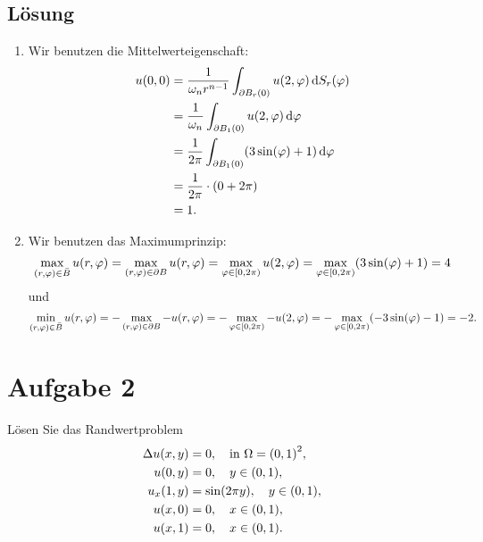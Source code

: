 \documentclass{exercise}
\begin{document}
    \subsection*{Lösung}
    \begin{enumerate}
        \item Wir benutzen die Mittelwerteigenschaft:
        \begin{align*}
            u\parentheses*{0, 0} &= \frac{1}{\omega_n r^{n - 1}}\int_{\partial B_r\parentheses*{0}}u\parentheses*{2, \varphi}\d S_r\parentheses*{\varphi}\\
            &= \frac{1}{\omega_n}\int_{\partial B_1\parentheses*{0}}u\parentheses*{2, \varphi}\d\varphi\\
            &= \frac{1}{2\pi}\int_{\partial B_1\parentheses*{0}}\parentheses*{3\sin\parentheses*{\varphi} + 1}\d\varphi\\
            &= \frac{1}{2\pi} \cdot \parentheses*{0 + 2\pi}\\
            &= 1.
        \end{align*}
        \item Wir benutzen das Maximumprinzip:
        \[
            \max_{\parentheses*{r, \varphi} \in \bar{B}}u\parentheses*{r, \varphi} = \max_{\parentheses*{r, \varphi} \in \partial B}u\parentheses*{r, \varphi} = \max_{\varphi \in \left[0, 2\pi\right)}u\parentheses*{2, \varphi} = \max_{\varphi \in \left[0, 2\pi\right)}\parentheses*{3\sin\parentheses*{\varphi} + 1} = 4
        \]
        und
        \[
            \min_{\parentheses*{r, \varphi} \in \bar{B}}u\parentheses*{r, \varphi} = -\max_{\parentheses*{r, \varphi} \in \partial B}-u\parentheses*{r, \varphi} = -\max_{\varphi \in \left[0, 2\pi\right)}-u\parentheses*{2, \varphi} = -\max_{\varphi \in \left[0, 2\pi\right)}\parentheses*{-3\sin\parentheses*{\varphi} - 1} = -2.
        \]
    \end{enumerate}


    \section*{Aufgabe 2}

    \begin{problem}
        Lösen Sie das Randwertproblem
        \begin{align*}
            \Delta u\parentheses*{x, y} &= 0, \quad \text{in }\Omega = \parentheses*{0, 1}^2,\\
            u\parentheses*{0, y} &= 0, \quad y \in \parentheses*{0, 1},\\
            u_x\parentheses*{1, y} &= \sin\parentheses*{2\pi y}, \quad y \in \parentheses*{0, 1},\\
            u\parentheses*{x, 0} &= 0, \quad x \in \parentheses*{0, 1},\\
            u\parentheses*{x, 1} &= 0, \quad x \in \parentheses*{0, 1}.
        \end{align*}
    \end{problem}
\end{document}
